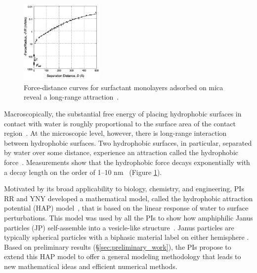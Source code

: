 \begin{figure}
\vspace{-8pt}
\centerline
{
\includegraphics[width=0.36\textwidth]{figures/Background/LongRangeForce.jpg}
}
\caption{\label{fig:force_distance}
Force-distance curves for surfactant
monolayers adsorbed on mica reveal a long-range
attraction~\cite{Lin2005}.}
\end{figure}

Macroscopically, the substantial free energy of placing hydrophobic
surfaces in contact with water is roughly proportional to the surface
area of the contact region~\cite{Bjorneholm2016}.
At the microscopic level, however, there is long-range interaction
between hydrophobic surfaces. Two hydrophobic surfaces, in particular,
separated by water over some distance, experience an attraction
called the
hydrophobic force~\cite{Lum1999, Meyer2006, Hammer2010, KaScScNe16}.
Measurements show that the hydrophobic force decays exponentially with a
decay length on the order of 1--10 nm~
\cite{Israelachvili1984,Marcelja1977,Christenson2001,Lin2005,Taetal13}
(Figure \ref{fig:force_distance}).

Motivated by its broad applicability to biology, chemistry, and engineering,
PIs RR and YNY developed a mathematical model, called the
hydrophobic attraction potential (HAP) model~\cite{Fu2018_SIAM},
that is based on
the linear response of water to surface perturbations. This model was
used by all the PIs to show how amphiphilic Janus particles (JP)
self-assemble into a vesicle-like structure~\cite{FuQuRyYo20}.
Janus particles are typically spherical particles with a biphasic
material label on either hemisphere \cite{CaFaRaVe89,Gaetal13,Mallory2017,HaBr20,McBr21}.
Based on
preliminary results (\S\ref{sec:preliminary_work}), the PIs propose to
extend this HAP model to offer a general modeling methodology that leads
to new mathematical ideas and efficient numerical methods.

